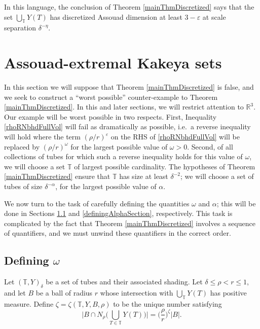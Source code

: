 \documentclass[letterpaper, reqno,11pt]{article}
\numberwithin{equation}{section}
\newcommand{\RR}{\mathbb{R}}
\newcommand{\eps}{\varepsilon}
\newcommand{\tubes}{\mathbb{T}}
\numberwithin{thm}{section}
\theoremstyle{remark}
\begin{document}
In this language, the conclusion of Theorem \ref{mainThmDiscretized} says that the set $\bigcup_{\tubes}Y(T)$ has discretized Assouad dimension at least $3-\eps$ at scale separation $\delta^{-\eta}.$


\section{Assouad-extremal Kakeya sets}\label{AssouadDimensionSection}

In this section we will suppose that Theorem \ref{mainThmDiscretized} is false, and we seek to construct a ``worst possible'' counter-example to Theorem \ref{mainThmDiscretized}. In this and later sections, we will restrict attention to $\RR^3$. Our example will be worst possible in two respects. First, Inequality \eqref{rhoRNbhdFullVol} will fail as dramatically as possible, i.e.~a reverse inequality will hold where the term $(\rho/r)^\eps$ on the RHS of \eqref{rhoRNbhdFullVol} will be replaced by $(\rho/r)^\omega$ for the largest possible value of $\omega>0$. Second, of all collections of tubes for which such a reverse inequality holds for this value of $\omega$, we will choose a set $\tubes$ of largest possible cardinality. The hypotheses of Theorem \ref{mainThmDiscretized} ensure that $\tubes$ has size at least $\delta^{-2}$; we will choose a set of tubes of size $\delta^{-\alpha}$, for the largest possible value of $\alpha$. 

We now turn to the task of carefully defining the quantities $\omega$ and $\alpha$; this will be done in Sections \ref{definingOmegaSection} and \ref{definingAlphaSection}, respectively. This task is complicated by the fact that Theorem \ref{mainThmDiscretized} involves a sequence of quantifiers, and we must unwind these quantifiers in the correct order. 



\subsection{Defining $\omega$}\label{definingOmegaSection}

Let $(\tubes,Y)_\delta$ be a set of tubes and their associated shading. Let $\delta\leq\rho< r\leq 1$, and let $B$ be a ball of radius $r$ whose intersection with $\bigcup_\tubes Y(T)$ has positive measure.  Define $\zeta=\zeta( \tubes,Y,B, \rho)$ to be the unique number satisfying
\begin{equation}\label{defnZetaTubesRhoR}
\Big|B \cap  N_{\rho}\Big(\bigcup_{T\in\tubes}Y(T)\Big)\Big| = \Big(\frac{\rho}{r}\Big)^{\zeta} |B|.
\end{equation}
\end{document}
